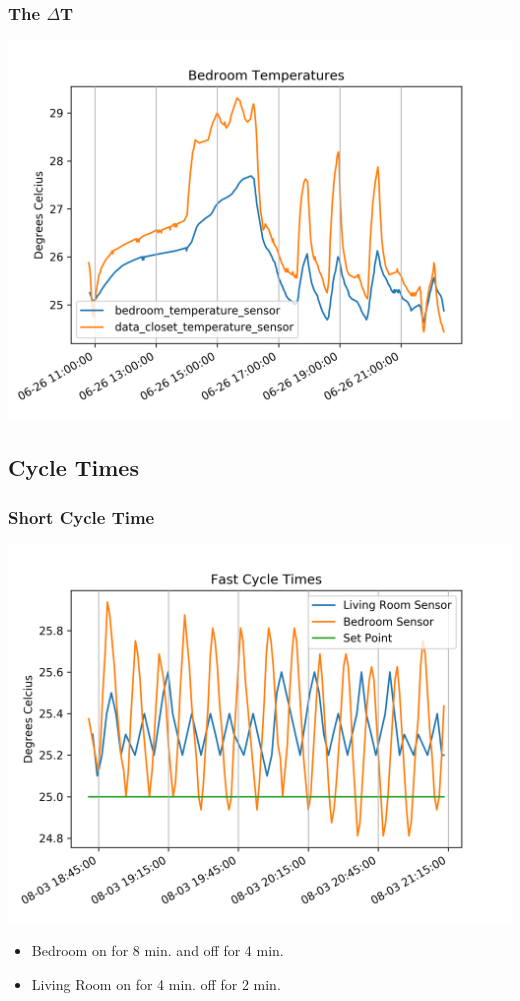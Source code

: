 \documentclass[aspectratio=169,11pt,hyperref={colorlinks=true}]{beamer}
\begin{document}
\begin{frame}
    \frametitle{The $\Delta$T}
    \begin{center}
        \includegraphics[height=.9\textheight]{datacloset_graph.png}
    \end{center}
\end{frame}

\subsection{Cycle Times}
\begin{frame}
    \frametitle{Short Cycle Time}
    \begin{center}
        \includegraphics[height=.75\textheight]{short_cycle.png}
    \end{center}
    \begin{itemize}
        \item Bedroom on for 8 min. and off for 4 min.
        \item Living Room on for 4 min. off for 2 min.
    \end{itemize}
\end{frame}
\end{document}

